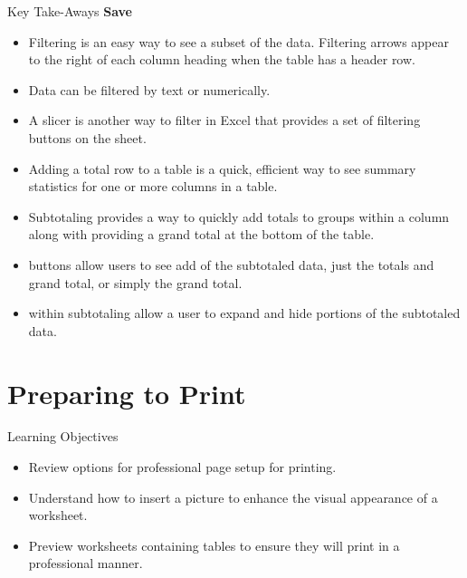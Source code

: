 \begin{center}
	\begin{tkwbox}{Key Take-Aways}
		\textbf{Save}
		\\
		\begin{itemize}
			\setlength{\itemsep}{0pt}
			\setlength{\parskip}{0pt}
			\setlength{\parsep}{0pt}

			\item Filtering is an easy way to see a subset of the data. Filtering arrows appear to the right of each column heading when the table has a header row.
			\item Data can be filtered by text or numerically.
			\item A slicer is another way to filter in Excel that provides a set of filtering buttons on the sheet.
			\item Adding a total row to a table is a quick, efficient way to see summary statistics for one or more columns in a table.
			\item Subtotaling provides a way to quickly add totals to groups within a column along with providing a grand total at the bottom of the table.
			\item {} buttons allow users to see add of the subtotaled data, just the totals and grand total, or simply the grand total.
			\item {} within subtotaling allow a user to expand and hide portions of the subtotaled data.
			
		\end{itemize}
	\end{tkwbox}
\end{center}

\section{Preparing to Print}

\begin{center}
	\begin{objbox}{Learning Objectives}
		\begin{itemize}
			\setlength{\itemsep}{0pt}
			\setlength{\parskip}{0pt}
			\setlength{\parsep}{0pt}

			\item Review options for professional page setup for printing.
			\item Understand how to insert a picture to enhance the visual appearance of a worksheet.
			\item Preview worksheets containing tables to ensure they will print in a professional manner.
			
		\end{itemize}
	\end{objbox}
\end{center}

